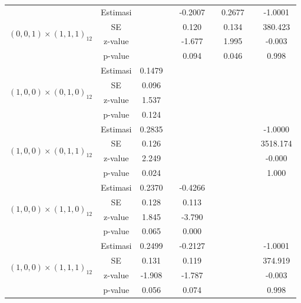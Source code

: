 \begin{enumerate}[label=\alph*.]
\begin{longtable}{|c|c|c|c|c|c|c|c|c|}
            \multirow{4}{*}{$(0,0,1)\times(1,1,1)_{12}$}
            & Estimasi & {} & {} & -0.2007 & {} & 0.2677 & {} & -1.0001 \\ \cline{2-9}
            & SE       & {} & {} & 0.120   & {} & 0.134 & {} & 380.423\\ \cline{2-9}
            & z-value  & {} & {} & -1.677  & {} & 1.995 & {} & -0.003\\ \cline{2-9}
            & p-value  & {} & {} & 0.094   & {} & 0.046 & {} & 0.998 \\ \hline

            \multirow{4}{*}{$(1,0,0)\times(0,1,0)_{12}$}
            & Estimasi & 0.1479  & {} & {} & {} & {} & {} & {} \\ \cline{2-9}
            & SE       & 0.096 & {} & {} & {} & {} & {} & {} \\ \cline{2-9}
            & z-value  & 1.537   & {} & {} & {} & {} & {} & {}\\ \cline{2-9}
            & p-value  & 0.124 & {} & {} & {} & {} & {} & {} \\ \hline

            \multirow{4}{*}{$(1,0,0)\times(0,1,1)_{12}$}
            & Estimasi & 0.2835  & {} & {} & {} & {} & {} & -1.0000\\ \cline{2-9}
            & SE       & 0.126  & {} & {} & {} & {} & {} & 3518.174\\ \cline{2-9}
            & z-value  & 2.249   & {} & {} & {} & {} & {} & -0.000\\ \cline{2-9}
            & p-value  & 0.024 & {} & {} & {} & {} & {} & 1.000\\ \hline

            \multirow{4}{*}{$(1,0,0)\times(1,1,0)_{12}$}
            & Estimasi & 0.2370  & {} & -0.4266 & {} & {} & {} & {}\\ \cline{2-9}
            & SE       & 0.128  & {} & 0.113 & {} & {} & {} & {}\\ \cline{2-9}
            & z-value  & 1.845   & {} & -3.790 & {} & {} & {}& {}\\ \cline{2-9}
            & p-value  & 0.065 & {} & 0.000 & {} & {} & {} & {}\\ \hline

            \multirow{4}{*}{$(1,0,0)\times(1,1,1)_{12}$}
            & Estimasi & 0.2499  & {} & -0.2127 & {} & {} & {} & -1.0001 \\ \cline{2-9}
            & SE       & 0.131    & {} & 0.119 & {} & {} & {} & 374.919\\ \cline{2-9}
            & z-value  & -1.908   & {} & -1.787 & {} & {} & {} & -0.003\\ \cline{2-9}
            & p-value  & 0.056    & {} &  0.074 & {} & {} & {} & 0.998\\ \hline


\end{longtable}
\end{enumerate}
